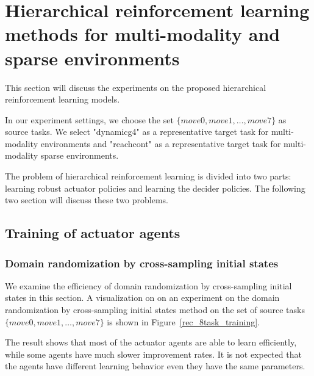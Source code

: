 
\section{Hierarchical reinforcement learning methods for multi-modality and sparse environments}
This section will discuss the experiments on the proposed hierarchical reinforcement learning models.

In our experiment settings, we choose the set $\{move0, move1, \dots, move7 \}$ as source tasks. We select "dynamicg4" as a representative target task for multi-modality environments and "reachcont" as a representative target task for multi-modality sparse environments.

The problem of hierarchical reinforcement learning is divided into two parts: learning robust actuator policies and learning the decider policies. The following two section will discuss these two problems.

\subsection{Training of actuator agents}

\subsubsection{Domain randomization by cross-sampling initial states}
We examine the efficiency of domain randomization by cross-sampling initial states in this section. A visualization on on an experiment on the domain randomization by cross-sampling initial states method on the set of source tasks $\{move0, move1, \dots, move7 \}$ is shown in Figure~\ref{rec_8task_training}.

The result shows that most of the actuator agents are able to learn efficiently, while some agents have much slower improvement rates. It is not expected that the agents have different learning behavior even they have the same parameters. 


